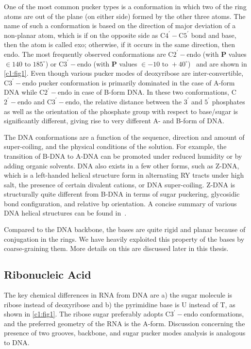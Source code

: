 One of the most common pucker types is a conformation in which two of the ring atoms are out of the plane (on either side) formed by the other three atoms.
The name of such a conformation is based on the direction of major deviation of a non-planar atom, which is if on the opposite side as
C$4^\prime-$C$5^\prime$ bond and base, then the atom is called exo; otherwise, if it occurs in the same direction, then endo. 
The most frequently observed conformations are 
C$2^\prime-$endo (with \textbf{\textsc{P}} values $\in 140 \text{ to } 185^\circ$) or C$3^\prime-$endo (with \textbf{\textsc{P}} 
values $\in -10 \text{ to } +40^\circ$)~\cite{neidle2018principles} and are shown in \cref{c1:fig1}.
Even though various pucker modes of deoxyribose  are inter-convertible,
C$3^\prime-$endo pucker conformation is primarily dominated in the case of A-form DNA while
C$2^\prime-$endo in case of B-form DNA.
In these two conformations, C$2^\prime-$endo and C$3^\prime-$endo, the relative distance between the $3^\prime$ and $5^\prime$ phosphates as well as the orientation of the phosphate group with respect to base/sugar is significantly different, giving rise to very different A- and B-form of DNA. 

The DNA conformations are a function of the sequence, direction and amount of super-coiling, and the physical conditions of the solution. 
For example, the transition of B-DNA to A-DNA can be promoted under reduced humidity or by adding organic solvents.
DNA also exists in a few other forms, such as Z-DNA, which is a left-handed helical structure form in alternating RY tracts under high salt, the presence of certain divalent cations, or DNA super-coiling. 
Z-DNA is structurally quite different from B-DNA in terms of sugar puckering, glycosidic bond configuration, and relative bp orientation.
A concise summary of various DNA helical structures can be found in~\cite{ussery2002dna}. 

Compared to the DNA backbone, the bases are quite rigid and planar because of conjugation in the rings. 
We have heavily exploited this property of the bases by coarse-graining them. More details on this are discussed later in this thesis. 


\subsection{Ribonucleic Acid}\label{c1:s2:sb2}
The key chemical differences in RNA from DNA are a) the sugar molecule is ribose instead of deoxyribose and b) 
the pyrimidine base is U instead of T, as shown in \cref{c1:fig1}.
The ribose sugar preferably adopts C$3^\prime-$endo conformations, and the preferred geometry of the RNA is the A-form.
Discussion concerning the presence of two grooves, backbone, and sugar pucker modes analysis is analogous to DNA. 

